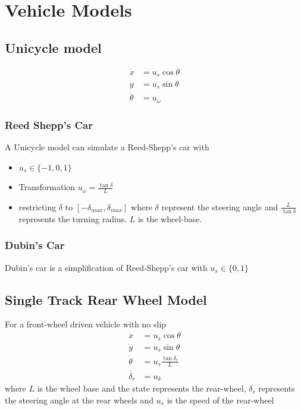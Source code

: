 \setcounter{chapter}{0}
\chapter{Vehicle Models}
\section{Unicycle model}

\begin{align}
\dot{x} &= u_s\cos{\theta}\\
\dot{y} &= u_s\sin{\theta}\\
\dot{\theta} &= u_\omega
\end{align}
\subsection{Reed Shepp's Car}
A Unicycle model can simulate a Reed-Shepp's car with 
\begin{itemize}
    \item $u_s \in \{-1, 0, 1\}$
    \item Transformation $u_{\omega}=\frac{\tan{\delta}}{L}$
    \item restricting $\delta$ to $[-\delta_{max}, \delta_{max}]$ where $\delta$ represent the steering angle and $\frac{L}{\tan\delta}$ represents the turning radius. $L$ is the wheel-base.
\end{itemize} 
\subsection{Dubin's Car}
Dubin's car is a simplification of Reed-Shepp's car  with $u_s \in \{0, 1\}$ 


\section{Single Track Rear Wheel Model}
For a front-wheel driven vehicle with no slip
\begin{align}
\dot{x} &= u_s\cos{\theta} \\
\dot{y} & = u_s\sin{\theta} \\
\dot{\theta} & = u_s \frac{\tan{\delta_r}}{L} \\
\dot{\delta_r} &= u_\delta
\end{align}
where $L$ is the wheel base and the state represents the rear-wheel, $\delta_r$ represents the steering angle at the rear wheels and $u_s$ is the speed of the rear-wheel

